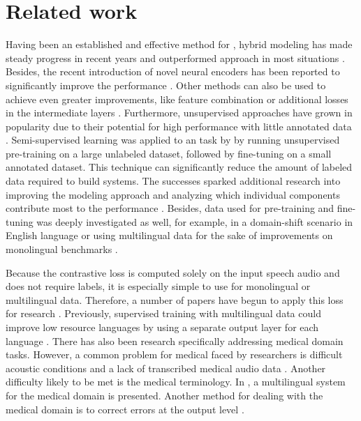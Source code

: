 \section{Related work}
\label{sec: Related_work}

Having been an established and effective method for , hybrid modeling has made steady progress in recent years and outperformed  approach in most  situations \cite{RASR-hybrid_vs_attention}.
Besides, the recent introduction of novel neural encoders has been reported to significantly improve the performance \cite{facebook2020hybrid, google2020conformer, zeineldeen2022conformer}.
Other methods can also be used to achieve even greater improvements, like feature combination \cite{vieting2021waveform} or additional losses in the intermediate layers \cite{facebook2020dejavu}.
Furthermore, unsupervised approaches have grown in popularity due to their potential for high performance with little annotated data \cite{mohamed2022representation_review}. 
Semi-supervised learning was applied to an  task by \cite{deepmind2020cpc, facebook2019wav2vec, wav2vec2} by running unsupervised pre-training on a large unlabeled dataset, followed by fine-tuning on a small annotated dataset.
This technique can significantly reduce the amount of labeled data required to build  systems.
The successes sparked additional research into improving the modeling approach \cite{facebook2021hubert, facebook2022wav2vecaug} and analyzing which individual components contribute most to the performance \cite{livescu2021wav2vec_analysis}.
Besides, data used for pre-training and fine-tuning was deeply investigated as well, for example, in a domain-shift scenario \cite{robust_wav2vec2} in English language or using multilingual data for the sake of improvements on monolingual benchmarks \cite{xlsr53}.

Because the contrastive loss is computed solely on the input speech audio and does not require labels, it is especially simple to use for monolingual or multilingual data.
Therefore, a number of papers have begun to apply this loss for  research \cite{xlsr53, microsoft2021unispeech, zhang2021xlst, google2022just}.
Previously, supervised training with multilingual data could improve low resource languages by using a separate output layer for each language \cite{tuske2014multilingual}.
There has also been research specifically addressing medical domain tasks.
However, a common problem for medical  faced by researchers is difficult acoustic conditions and a lack of transcribed medical audio data \cite{edwards2017medicalspeech, chiu2018medconv, kar2021operation}.
Another difficulty likely to be met is the medical terminology.
In \cite{sakti2014towards}, a multilingual system for the medical domain is presented.
Another method for dealing with the medical domain is to correct  errors at the output level \cite{mani2020towardsmedical}.

